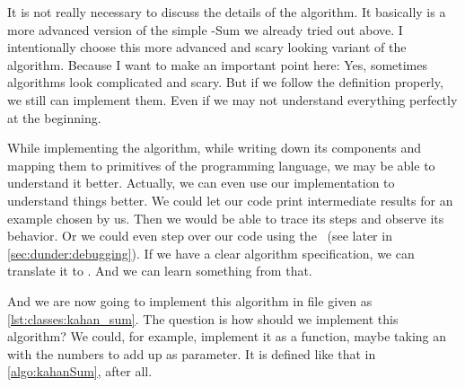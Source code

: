 It is not really necessary to discuss the details of the algorithm.
It basically is a more advanced version of the simple \citeauthor{K1965PFRORTE}-Sum we already tried out above.
I intentionally choose this more advanced and scary looking variant of the algorithm.
Because I want to make an important point here:
Yes, sometimes algorithms look complicated and scary.
But if we follow the definition properly, we still can implement them.
Even if we may not understand everything perfectly at the beginning.

While implementing the algorithm, while writing down its components and mapping them to primitives of the programming language, we may be able to understand it better.
Actually, we can even use our implementation to understand things better.
We could let our code print intermediate results for an example chosen by us.
Then we would be able to trace its steps and observe its behavior.
Or we could even step over our code using the ~(see later in \cref{sec:dunder:debugging}).
If we have a clear algorithm specification, we can translate it to \python.
And we can learn something from that.

And we are now going to implement this algorithm in file  given as \cref{lst:classes:kahan_sum}.
The question is how should we implement this algorithm?
We could, for example, implement it as a function, maybe taking an   with the numbers to add up as parameter.
It is defined like that in \cref{algo:kahanSum}, after all.

